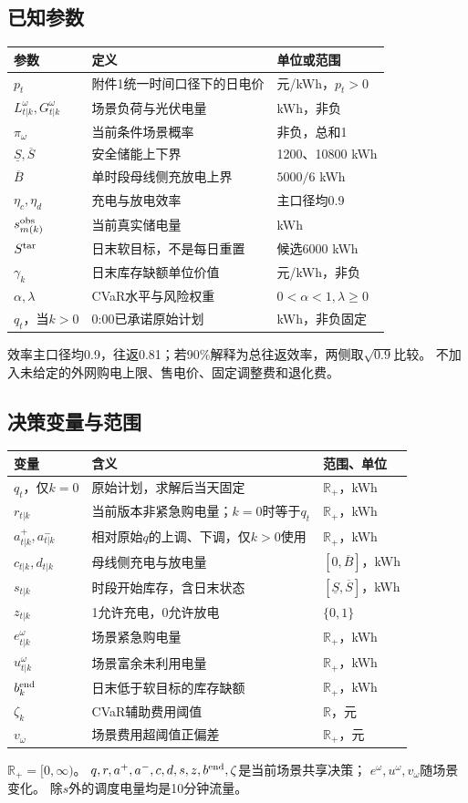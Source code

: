 \documentclass[UTF8,11pt]{ctexart}
\newcommand{\R}{\mathbb R}
\begin{document}
\subsection{已知参数}
\begin{longtable}{p{3.2cm}p{7.0cm}p{3.6cm}}
\toprule 参数 & 定义 & 单位或范围\\ \midrule
\endhead
$p_t$ & 附件1统一时间口径下的日电价 & 元/kWh，$p_t>0$\\
$L^\omega_{t|k},G^\omega_{t|k}$ & 场景负荷与光伏电量 & kWh，非负\\
$\pi_\omega$ & 当前条件场景概率 & 非负，总和1\\
$\underline S,\overline S$ & 安全储能上下界 & 1200、10800 kWh\\
$\overline B$ & 单时段母线侧充放电上界 & $5000/6$ kWh\\
$\eta_c,\eta_d$ & 充电与放电效率 & 主口径均0.9\\
$s^{\rm obs}_{m(k)}$ & 当前真实储电量 & kWh\\
$S^{\rm tar}$ & 日末软目标，不是每日重置 & 候选6000 kWh\\
$\gamma_k$ & 日末库存缺额单位价值 & 元/kWh，非负\\
$\alpha,\lambda$ & CVaR水平与风险权重 & $0<\alpha<1,\lambda\geq0$\\
$q_t$，当$k>0$ & 0:00已承诺原始计划 & kWh，非负固定\\
\bottomrule
\end{longtable}
效率主口径均0.9，往返0.81；若90\%解释为总往返效率，两侧取$\sqrt{0.9}$比较。
不加入未给定的外网购电上限、售电价、固定调整费和退化费。

\subsection{决策变量与范围}
\begin{longtable}{p{3.1cm}p{7.0cm}p{3.7cm}}
\toprule 变量 & 含义 & 范围、单位\\ \midrule
\endhead
$q_t$，仅$k=0$ & 原始计划，求解后当天固定 & $\R_+$，kWh\\
$r_{t|k}$ & 当前版本非紧急购电量；$k=0$时等于$q_t$ & $\R_+$，kWh\\
$a^+_{t|k},a^-_{t|k}$ & 相对原始$q$的上调、下调，仅$k>0$使用 & $\R_+$，kWh\\
$c_{t|k},d_{t|k}$ & 母线侧充电与放电量 & $[0,\overline B]$，kWh\\
$s_{t|k}$ & 时段开始库存，含日末状态 & $[\underline S,\overline S]$，kWh\\
$z_{t|k}$ & 1允许充电，0允许放电 & $\{0,1\}$\\
$e^\omega_{t|k}$ & 场景紧急购电量 & $\R_+$，kWh\\
$u^\omega_{t|k}$ & 场景富余未利用电量 & $\R_+$，kWh\\
$b_k^{\rm end}$ & 日末低于软目标的库存缺额 & $\R_+$，kWh\\
$\zeta_k$ & CVaR辅助费用阈值 & $\R$，元\\
$v_\omega$ & 场景费用超阈值正偏差 & $\R_+$，元\\
\bottomrule
\end{longtable}
$\R_+=[0,\infty)$。
$q,r,a^+,a^-,c,d,s,z,b^{\rm end},\zeta$是当前场景共享决策；
$e^\omega,u^\omega,v_\omega$随场景变化。
除$s$外的调度电量均是10分钟流量。
\end{document}
